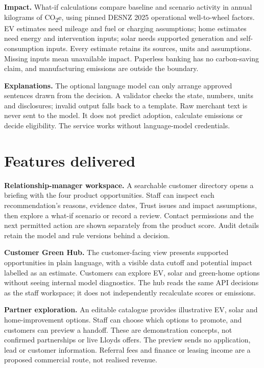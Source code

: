 \documentclass[10pt,a4paper]{article}
\newcommand{\coe}{CO\textsubscript{2}e}
\begin{document}
\textbf{Impact.} What-if calculations compare baseline and scenario activity in annual kilograms of \coe, using pinned DESNZ 2025 operational well-to-wheel factors. EV estimates need mileage and fuel or charging assumptions; home estimates need energy and intervention inputs; solar needs supported generation and self-consumption inputs. Every estimate retains its sources, units and assumptions. Missing inputs mean unavailable impact. Paperless banking has no carbon-saving claim, and manufacturing emissions are outside the boundary.

\textbf{Explanations.} The optional language model can only arrange approved sentences drawn from the decision. A validator checks the state, numbers, units and disclosures; invalid output falls back to a template. Raw merchant text is never sent to the model. It does not predict adoption, calculate emissions or decide eligibility. The service works without language-model credentials.

\newpage
\section{Features delivered}
\textbf{Relationship-manager workspace.} A searchable customer directory opens a briefing with the four product opportunities. Staff can inspect each recommendation's reasons, evidence dates, Trust issues and impact assumptions, then explore a what-if scenario or record a review. Contact permissions and the next permitted action are shown separately from the product score. Audit details retain the model and rule versions behind a decision.

\textbf{Customer Green Hub.} The customer-facing view presents supported opportunities in plain language, with a visible data cutoff and potential impact labelled as an estimate. Customers can explore EV, solar and green-home options without seeing internal model diagnostics. The hub reads the same API decisions as the staff workspace; it does not independently recalculate scores or emissions.

\textbf{Partner exploration.} An editable catalogue provides illustrative EV, solar and home-improvement options. Staff can choose which options to promote, and customers can preview a handoff. These are demonstration concepts, not confirmed partnerships or live Lloyds offers. The preview sends no application, lead or customer information. Referral fees and finance or leasing income are a proposed commercial route, not realised revenue.
\end{document}
